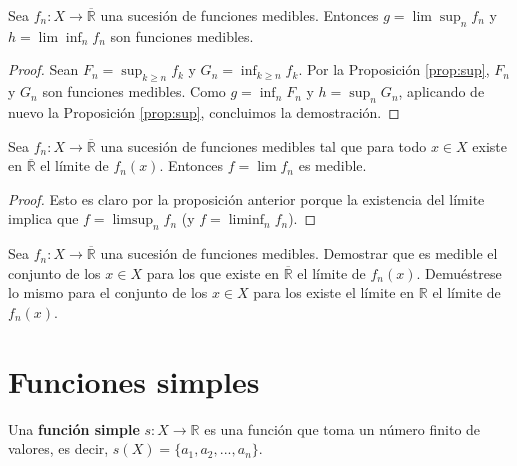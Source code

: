 \begin{prop}
Sea $f_n: X \longrightarrow \overline{\mathbb{R}}$ una sucesión de funciones medibles. Entonces $g = \lim{\sup_n{f_n}}$ y $h = \lim{\inf_n{f_n}}$ son funciones medibles.
\end{prop}

\begin{proof}
Sean $F_n = \sup_{k \ge n}{f_k}$ y $G_n = \inf_{k \ge n}{f_k}$. Por la Proposición \ref{prop:sup}, $F_n$ y $G_n$ son funciones medibles. Como $g = \inf_n{F_n}$ y $h = \sup_n{G_n}$, aplicando de nuevo la Proposición \ref{prop:sup}, concluimos la demostración.
\end{proof}

\begin{prop}
Sea $f_n: X \longrightarrow \overline{\mathbb{R}}$ una sucesión de funciones medibles tal que para todo $x \in X$ existe en $\overline{\mathbb{R}}$ el límite de $f_n(x)$. Entonces $f = \lim{f_n}$ es medible.
\end{prop}

\begin{proof}
Esto es claro por la proposición anterior porque la existencia del límite implica que $f = \limsup_n{f_n}$ (y $f = \liminf_n{f_n}$).
\end{proof}

\begin{ejemplo}
Sea $f_n: X \longrightarrow \overline{\mathbb{R}}$ una sucesión de funciones medibles. Demostrar que es medible el conjunto de los $x \in X$ para los que existe en $\overline{\mathbb{R}}$ el límite de $f_n(x)$. Demuéstrese lo mismo para el conjunto de los $x \in X$ para los existe el límite en $\mathbb{R}$ el límite de $f_n(x)$.
\end{ejemplo}

\section{Funciones simples}

\begin{defi}
Una \textbf{función simple} $s: X \longrightarrow \mathbb{R}$ es una función que toma un número finito de valores, es decir, $s(X) = \{ a_1, a_2, ..., a_n\}$. 
\end{defi}


